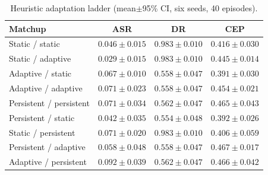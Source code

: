 \begin{table}[!t]
\caption{Heuristic adaptation ladder (mean$\pm$95\% CI, six seeds, 40 episodes).}
\label{tab:ladder}
\centering
\begin{tabular}{@{}lccc@{}}
\toprule
\textbf{Matchup} & \textbf{ASR} & \textbf{DR} & \textbf{CEP} \\
\midrule
Static / static          & $0.046{\pm}0.015$ & $0.983{\pm}0.010$ & $0.416{\pm}0.030$ \\
Static / adaptive        & $0.029{\pm}0.015$ & $0.983{\pm}0.010$ & $0.445{\pm}0.014$ \\
Adaptive / static        & $0.067{\pm}0.010$ & $0.558{\pm}0.047$ & $0.391{\pm}0.030$ \\
Adaptive / adaptive      & $0.071{\pm}0.023$ & $0.558{\pm}0.047$ & $0.454{\pm}0.021$ \\
Persistent / persistent  & $0.071{\pm}0.034$ & $0.562{\pm}0.047$ & $0.465{\pm}0.043$ \\
Persistent / static      & $0.042{\pm}0.035$ & $0.554{\pm}0.048$ & $0.392{\pm}0.026$ \\
Static / persistent      & $0.071{\pm}0.020$ & $0.983{\pm}0.010$ & $0.406{\pm}0.059$ \\
Persistent / adaptive    & $0.058{\pm}0.048$ & $0.558{\pm}0.047$ & $0.467{\pm}0.017$ \\
Adaptive / persistent    & $0.092{\pm}0.039$ & $0.562{\pm}0.047$ & $0.466{\pm}0.042$ \\
\bottomrule
\end{tabular}
\end{table}
